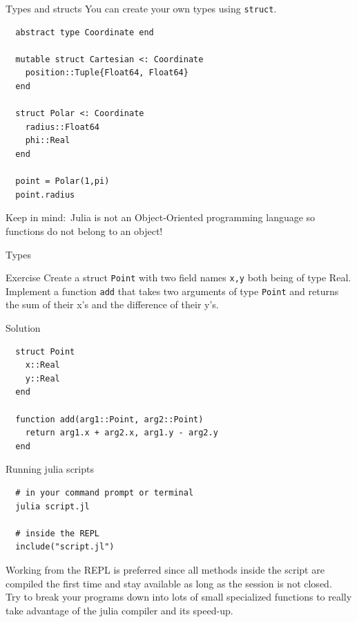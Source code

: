 \documentclass{beamer}
\begin{document}
\begin{frame}[fragile]{Types and structs}
 You can create your own types using \verb|struct|.
  \begin{lstlisting}
  abstract type Coordinate end
  
  mutable struct Cartesian <: Coordinate
    position::Tuple{Float64, Float64}
  end
  
  struct Polar <: Coordinate
    radius::Float64
    phi::Real
  end
  
  point = Polar(1,pi)
  point.radius
  \end{lstlisting}
Keep in mind:~Julia is not an Object-Oriented programming language so functions do not belong to an object!
\end{frame}

\begin{frame}[fragile]{Types}
	\begin{block}{Exercise}
		Create a struct \verb|Point| with two field names \verb|x,y| both being of type Real. Implement a function \verb|add| that takes two arguments of type \verb|Point| and returns the sum of their x's and the difference of their y's.
	\end{block}
	\vfill
	\begin{block}{Solution}
		\begin{lstlisting}
  struct Point
    x::Real
    y::Real
  end
  
  function add(arg1::Point, arg2::Point)
    return arg1.x + arg2.x, arg1.y - arg2.y
  end
		\end{lstlisting}
	\end{block}
\end{frame}



\begin{frame}[fragile]{Running julia scripts}
 \begin{lstlisting}
  # in your command prompt or terminal
  julia script.jl
  
  # inside the REPL
  include("script.jl")
\end{lstlisting}
Working from the REPL is preferred since all methods inside the script are compiled the first time and stay available as long as the session is not closed.\\

\vspace{4mm}
Try to break your programs down into lots of small specialized functions to really take advantage of the julia compiler and its speed-up.
\end{frame}
\end{document}
